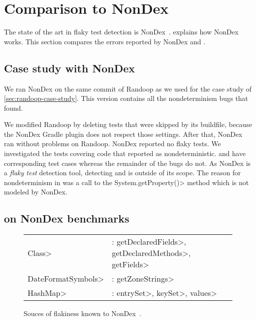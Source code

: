\section{Comparison to NonDex}

The state of the art in flaky test detection is NonDex~\cite{nondex}.
 explains how NonDex works. This section compares the
errors reported by NonDex and \theDeterminismChecker.

\subsection{Case study with NonDex}\label{sec:nondex-randoop}

We ran NonDex on the same commit of Randoop as we used for the case study
of \cref{sec:randoop-case-study}.  This version contains all the nondeterminism bugs that
\theDeterminismChecker found.

We modified Randoop by deleting tests that were skipped by its buildfile,
because the NonDex Gradle plugin does not respect those settings.
After that, NonDex ran without problems on Randoop.
NonDex reported no flaky tests.
We investigated the tests covering code that \theDeterminismChecker reported as nondeterministic.
\bugHashSet and \bugClasspath have corresponding test cases whereas the remainder of the bugs do not.
As NonDex is a \textit{flaky test} detection tool, detecting \bugTimestampOutput and \bugTimestampOutput 
is outside of its scope.
The reason for nondeterminism in \bugClasspath was a call to the \<System.getProperty()> method which
is not modeled by NonDex.


\subsection{\TheDeterminismChecker on NonDex benchmarks}\label{sec:nondex-benchmarks}

\begin{figure}
    \begin{tabular}{lll}
        \<Class> & : \<getDeclaredFields>, \<getDeclaredMethods>, \<getFields> \\
        \<DateFormatSymbols> & : \<getZoneStrings> \\
        \<HashMap> & : \<entrySet>, \<keySet>, \<values>
    \end{tabular}
\caption{Souces of flakiness known to NonDex~\cite{nondex}.}
\label{fig:flaky-sources}
\end{figure}

